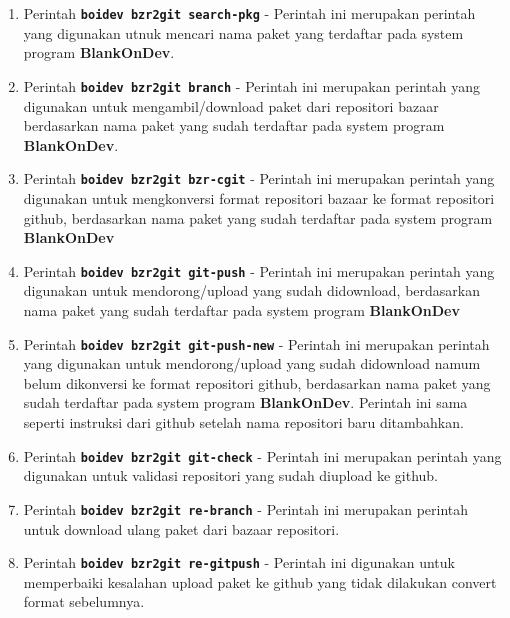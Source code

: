 \begin{enumerate}
	\item Perintah \texttt{\textbf{boidev bzr2git search-pkg}} - Perintah ini merupakan perintah yang digunakan utnuk mencari nama paket yang terdaftar pada system program \textbf{BlankOnDev}.

	\item Perintah \texttt{\textbf{boidev bzr2git branch}} - Perintah ini merupakan perintah yang digunakan untuk mengambil/download paket dari repositori bazaar berdasarkan nama paket yang sudah terdaftar pada system program \textbf{BlankOnDev}.

	\item Perintah \texttt{\textbf{boidev bzr2git bzr-cgit}} - Perintah ini merupakan perintah yang digunakan untuk mengkonversi format repositori bazaar ke format repositori github, berdasarkan nama paket yang sudah terdaftar pada system program \textbf{BlankOnDev}

	\item Perintah \texttt{\textbf{boidev bzr2git git-push}} - Perintah ini merupakan perintah yang digunakan untuk mendorong/upload yang sudah didownload, berdasarkan nama paket yang sudah terdaftar pada system program \textbf{BlankOnDev}

	\item Perintah \texttt{\textbf{boidev bzr2git git-push-new}} - Perintah ini merupakan perintah yang digunakan untuk mendorong/upload yang sudah didownload namum belum dikonversi ke format repositori github, berdasarkan nama paket yang sudah terdaftar pada system program \textbf{BlankOnDev}. Perintah ini sama seperti instruksi dari github setelah nama repositori baru ditambahkan.

	\item Perintah \texttt{\textbf{boidev bzr2git git-check}} - Perintah ini merupakan perintah yang digunakan untuk validasi repositori yang sudah diupload ke github.

	\item Perintah \texttt{\textbf{boidev bzr2git re-branch}} - Perintah ini merupakan perintah untuk download ulang paket dari bazaar repositori.

	\item Perintah \texttt{\textbf{boidev bzr2git re-gitpush}} - Perintah ini digunakan untuk memperbaiki kesalahan upload paket ke github yang tidak dilakukan convert format sebelumnya.
\end{enumerate}

